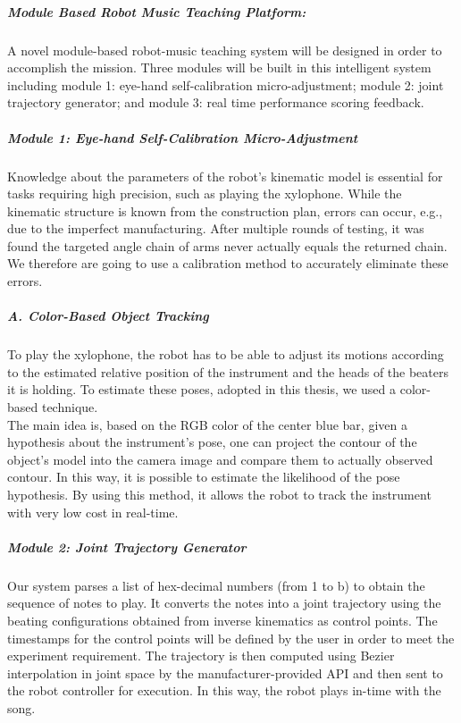 \documentclass[12pt, a4paper]{article}
\begin{document}
\subparagraph{Module Based Robot Music Teaching Platform:}A novel module-based robot-music 
teaching system will be designed in order to accomplish the mission. 
Three modules will be built in this intelligent system including module 1: eye-hand 
self-calibration micro-adjustment; module 2: joint trajectory generator; and 
module 3: real time performance scoring feedback.\\

\subparagraph{Module 1: Eye-hand Self-Calibration Micro-Adjustment}
Knowledge about the parameters of the robot's kinematic model is essential for 
tasks requiring high precision, such as playing the xylophone. While the kinematic 
structure is known from the construction plan, errors can occur, e.g., due to the 
imperfect manufacturing. After multiple rounds of testing, it was found the targeted angle chain 
of arms never actually equals the returned chain. We therefore are going to use a 
calibration method to accurately eliminate these errors.\\

\subparagraph{A. Color-Based Object Tracking}
To play the xylophone, the robot has to be able to adjust its motions according to
the estimated relative position of the instrument and the heads of the beaters it is 
holding. To estimate these poses, adopted in this thesis, we used a color-based technique.\\

The main idea is, based on the RGB color of the center blue bar, given a hypothesis 
about the instrument's pose, one can project the contour of the object's model into the 
camera image and compare them to actually observed contour. In this way, it is possible 
to estimate the likelihood of the pose hypothesis. By using this method, it allows
the robot to track the instrument with very low cost in real-time. \\

\subparagraph{Module 2: Joint Trajectory Generator}
Our system parses a list of hex-decimal numbers (from 1 to b) to obtain the sequence
of notes to play. It converts the notes into a joint trajectory using the beating
configurations obtained from inverse kinematics as control points. The timestamps
for the control points will be defined by the user in order to meet the experiment requirement.
The trajectory is then computed using Bezier interpolation in joint space by the
manufacturer-provided API and then sent to the robot controller for execution. In this
way, the robot plays in-time with the song.\\
\end{document}
